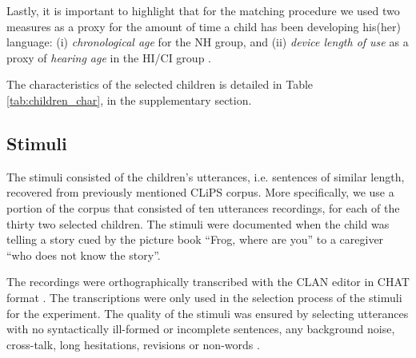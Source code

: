 Lastly, it is important to highlight that for the matching procedure we used two measures as a proxy for the amount of time a child has been developing his(her) language: (i) \textit{chronological age} for the NH group, and (ii) \textit{device length of use} as a proxy of \textit{hearing age} in the HI/CI group \citep{Faes_et_al_2021}.

The characteristics of the selected children is detailed in Table \ref{tab:children_char}, in the supplementary section. 
%
\begin{comment}
for the NH group uses the child's \textit{age} (at recording), the method cannot use the same variable for the other two groups. This is due to the fact that \textit{age} is merely used as a proxy, for the amount of time a child has been developing his(her) language. In that sense, more appropriate variables to use under the HI/CI group would be e.g. the \textit{device length of use}, which approximates the ``hearing age'' of such children, or their \textit{vocabulary size}, which resembles their "lexical age" \citep{Faes_et_al_2021}. For this research, we consider the \textit{device length of use} as the simplest one to implement. 
\end{comment}
%
%
\subsection{Stimuli} \label{ss:stimuli}
%
The stimuli consisted of the children's utterances, i.e. sentences of similar length, recovered from previously mentioned CLiPS corpus. More specifically, we use a portion of the corpus that consisted of ten utterances recordings, for each of the thirty two selected children. The stimuli were documented when the child was telling a story cued by the picture book ``Frog, where are you'' \citep{Mayer_1969} to a caregiver ``who does not know the story''. 

The recordings were orthographically transcribed with the CLAN editor in CHAT format \cite{MacWhinney_2020}. The transcriptions were only used in the selection process of the stimuli for the experiment. The quality of the stimuli was ensured by selecting utterances with no syntactically ill-formed or incomplete sentences, any background noise, cross-talk, long hesitations, revisions or non-words \citep{Boonen_et_al_2021}. 

